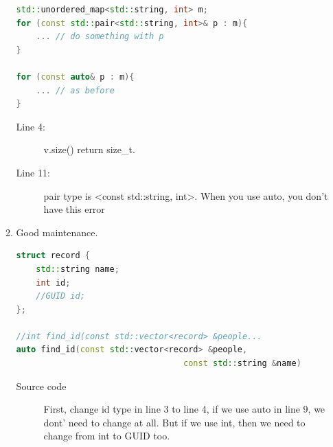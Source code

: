 \documentclass[a4paper,11pt,twoside]{book}
\begin{document}
\begin{itemize}
\begin{enumerate}
\begin{lstlisting}[frame=single, language=c++]
std::unordered_map<std::string, int> m;
for (const std::pair<std::string, int>& p : m){
	... // do something with p
}

for (const auto& p : m){
	... // as before
}
\end{lstlisting}
\begin{description}
	\item[Line 4:] v.size() return size\_t.
	\item[Line 11:] pair type is <const std::string, int>. When you use auto, you don't have this error
\end{description}
	\item Good maintenance.
\begin{lstlisting}[frame=single, language=c++, mathescape=true]
struct record {
	std::string name;
	int id;
	//GUID id; 
};

//int find_id(const std::vector<record> &people...
auto find_id(const std::vector<record> &people, 
                                  const std::string &name)
\end{lstlisting}
\begin{description}
	\item[Source code] First, change id type in line 3 to line 4, if we use auto in line 9, we dont' need to change at all. But if we use int, then we need to change from int to GUID too.
\end{description}

	\end{enumerate}
\end{itemize}
	
\end{document}
